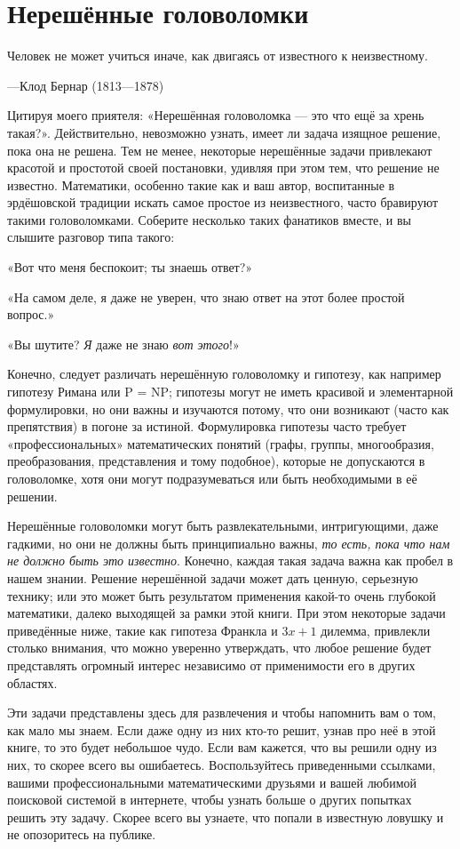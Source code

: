 \chapter*{Нерешённые головоломки}

\epigraph{Человек не может учиться иначе, как двигаясь от известного к неизвестному.}{---Клод Бернар (1813---1878)}

Цитируя моего приятеля: «Нерешённая головоломка --- это что ещё за хрень такая?».
Действительно, невозможно узнать, имеет ли задача изящное решение, пока она не решена.
Тем не менее, некоторые нерешённые задачи привлекают красотой и простотой своей постановки, удивляя при этом тем, что решение не известно.
Математики, особенно такие как и ваш автор, воспитанные в эрдёшовской традиции искать самое простое из неизвестного, часто бравируют такими головоломками.
Соберите несколько таких фанатиков вместе, и вы слышите разговор типа такого:

«Вот что меня беспокоит; ты знаешь ответ?»

«На самом деле, я даже не уверен, что знаю ответ на этот более простой вопрос.»

«Вы шутите? \emph{Я} даже не знаю \emph{вот этого}!»

Конечно, следует различать нерешённую головоломку и гипотезу, как например гипотезу Римана или P = NP;
гипотезы могут не иметь красивой и элементарной формулировки, но они важны и изучаются потому, что они возникают (часто как препятствия) в погоне за истиной.
Формулировка гипотезы часто требует «профессиональных» математических понятий (графы, группы, многообразия, преобразования, представления и тому подобное), которые не допускаются в головоломке, хотя они могут подразумеваться или быть необходимыми в её решении.

Нерешённые головоломки могут быть развлекательными, интригующими, даже гадкими,
но они не должны быть принципиально важны, \emph{то есть, пока что нам не должно быть это известно}.
Конечно, каждая такая задача важна как пробел в нашем знании.
Решение нерешённой задачи может дать ценную, серьезную технику; или это может быть результатом применения какой-то очень глубокой математики, далеко выходящей за рамки этой книги.
При этом некоторые задачи приведённые ниже, такие как гипотеза Франкла и $3x+1$ дилемма, привлекли столько внимания, что можно уверенно утверждать, что любое решение будет представлять огромный интерес независимо от применимости его в других областях.

Эти задачи представлены здесь для развлечения и чтобы напомнить вам о том, как мало мы знаем.
Если даже одну из них кто-то решит, узнав про неё в этой книге, то это будет небольшое чудо.
Если вам кажется, что вы решили одну из них, то скорее всего вы ошибаетесь.
Воспользуйтесь приведенными ссылками, вашими профессиональными математическими друзьями и вашей любимой поисковой системой в интернете, чтобы узнать больше о других попытках решить эту задачу.
Скорее всего вы узнаете, что попали в известную ловушку и не опозоритесь на публике.

